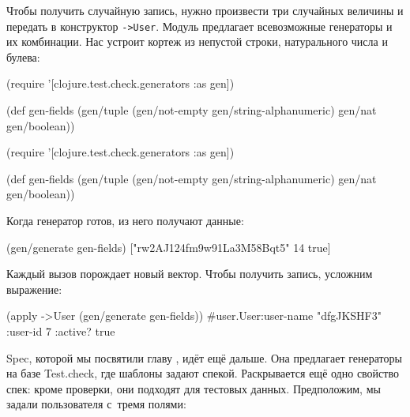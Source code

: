 \fi

Чтобы получить случайную запись, нужно произвести три случайных величины и
передать в конструктор \verb|->User|. Модуль предлагает всевозможные генераторы
и их комбинации. Нас устроит кортеж из непустой строки, натурального числа и
булева:

\ifx\DEVICETYPE\MOBILE

\begin{english}
  \begin{clojure}
(require
 '[clojure.test.check.generators
   :as gen])

(def gen-fields
  (gen/tuple
    (gen/not-empty
      gen/string-alphanumeric)
    gen/nat
    gen/boolean))
  \end{clojure}
\end{english}

\else

\begin{english}
  \begin{clojure}
(require '[clojure.test.check.generators :as gen])

(def gen-fields
  (gen/tuple (gen/not-empty gen/string-alphanumeric)
             gen/nat
             gen/boolean))
  \end{clojure}
\end{english}

\fi

Когда генератор готов, из него получают данные:

\begin{english}
  \begin{clojure}
(gen/generate gen-fields)
["rw2AJ124fm9w91La3M58Bqt5" 14 true]
  \end{clojure}
\end{english}

\noindent
Каждый вызов порождает новый вектор. Чтобы получить запись, усложним выражение:

\begin{english}
  \begin{clojure}
(apply ->User (gen/generate gen-fields))
#user.User{:user-name "dfgJKSHF3"
           :user-id 7
           :active? true}
  \end{clojure}
\end{english}

Spec, которой мы посвятили главу , идёт ещё дальше. Она
предлагает генераторы на базе Test.check, где шаблоны задают
спекой. Раскрывается ещё одно свойство спек: кроме проверки, они подходят для
тестовых данных. Предположим, мы задали пользователя с~тремя полями:

